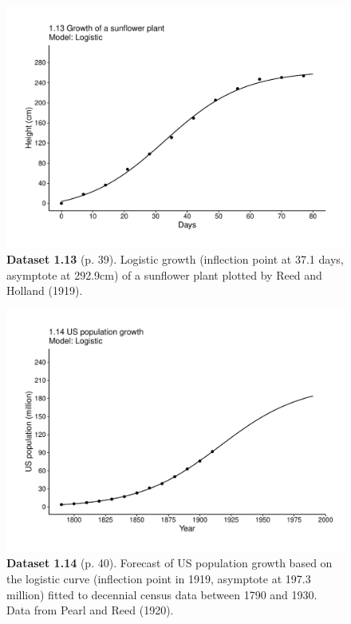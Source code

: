 \documentclass[aps,rmp,preprint,superscriptaddress,10pt,onecolumn]{article}
\begin{document}
\clearpage
\begin{figure}[h]
\includegraphics[width=\textwidth]{output/figs-ggplot/1.13.pdf}
\caption*{\textbf{Dataset 1.13} (p. 39). Logistic growth (inflection point at 37.1 days, asymptote at 292.9cm) of a sunflower plant plotted by Reed and Holland (1919). }
\end{figure}
	
\clearpage
\begin{figure}[h]
\includegraphics[width=\textwidth]{output/figs-ggplot/1.14.pdf}
\caption*{\textbf{Dataset 1.14} (p. 40). Forecast of US population growth based on the logistic curve (inflection point in 1919, asymptote at 197.3 million) fitted to decennial census data between 1790 and 1930. Data from Pearl and Reed (1920).}
\end{figure}
	
\end{document}
